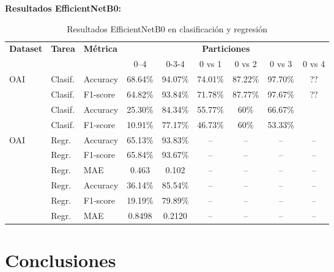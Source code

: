 \documentclass[11pt,spanish,listoffigures,listoftables]{tfgetsinf}
\begin{document}
\textbf{Resultados EfficientNetB0:}
\begin{table}[h]
    \centering
    \caption{Resultados EfficientNetB0 en clasificación y regresión}
    \label{tab:cnn_grande_results}
    \begin{tabular}{@{} l l l c c c c c c @{}} 
      \toprule
      \textbf{Dataset} & \textbf{Tarea} & \textbf{Métrica} 
        & \multicolumn{6}{c}{\textbf{Particiones}} \\
      \cmidrule(lr){4-9}
      & & & 0--4 & 0-3-4 & 0 vs 1 & 0 vs 2 & 0 vs 3 & 0 vs 4 \\
      \midrule
      \multirow{2}{*}{OAI}
        & Clasif. & Accuracy   & 68.64\% & 94.07\% & 74.01\% & 87.22\% & 97.70\% & ?? \\
        & Clasif. & F1-score   & 64.82\% & 93.84\% & 71.78\% & 87.77\% & 97.67\% & ?? \\
      \addlinespace
      \multirow{2}{*}{Gatos}
        & Clasif. & Accuracy   & 25.30\% & 84.34\% & 55.77\% & 60\% & 66.67\% &  \\
        & Clasif. & F1-score   & 10.91\% & 77.17\% & 46.73\% & 60\% & 53.33\% &  \\
      \midrule
      \multirow{3}{*}{OAI}
        & Regr.   & Accuracy   & 65.13\% & 93.83\% & -- & -- & -- & -- \\
        & Regr.   & F1-score   & 65.84\% & 93.67\% & -- & -- & -- & -- \\
        & Regr.   & MAE        & 0.463   & 0.102   & -- & -- & -- & -- \\
      \addlinespace
      \multirow{3}{*}{Gatos}
        & Regr.   & Accuracy   & 36.14\% & 85.54\% & -- & -- & -- & -- \\
        & Regr.   & F1-score   & 19.19\% & 79.89\% & -- & -- & -- & -- \\
        & Regr.   & MAE        & 0.8498 & 0.2120 & -- & -- & -- & -- \\
      \bottomrule
    \end{tabular}
\end{table}



  
\section{Conclusiones}

\end{document}
